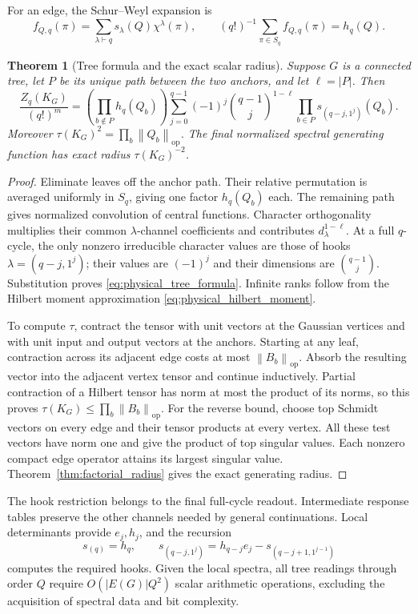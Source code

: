 \documentclass[11pt,a4paper]{amsart}
\numberwithin{equation}{section}
\newtheorem{theorem}{Theorem}[section]
\theoremstyle{definition}
\theoremstyle{remark}
\newcommand{\op}{\mathrm{op}}
\newcommand{\norm}[1]{\left\lVert#1\right\rVert}
\begin{document}
For an edge, the Schur--Weyl expansion \cite{Macdonald} is
\[
 f_{Q,q}(\pi)=\sum_{\lambda\vdash q}s_\lambda(Q)\chi^\lambda(\pi),\qquad
 (q!)^{-1}\sum_{\pi\in S_q}f_{Q,q}(\pi)=h_q(Q).
\]
\begin{theorem}[Tree formula and the exact scalar radius]\label{thm:physicaltree}
Suppose $G$ is a connected tree, let $P$ be its unique path between the two anchors, and let $\ell=|P|$. Then
\begin{equation}\label{eq:physical_tree_formula}
 \frac{Z_q(K_G)}{(q!)^m}
 =\left(\prod_{b\notin P}h_q(Q_b)\right)
 \sum_{j=0}^{q-1}(-1)^j\binom{q-1}j^{1-\ell}
                    \prod_{b\in P}s_{(q-j,1^j)}(Q_b).
\end{equation}
Moreover $\tau(K_G)^2=\prod_b\norm{Q_b}_{\op}$. The final normalized spectral generating function has exact radius $\tau(K_G)^{-2}$.
\end{theorem}
\begin{proof}
Eliminate leaves off the anchor path. Their relative permutation is averaged uniformly in $S_q$, giving one factor $h_q(Q_b)$ each. The remaining path gives normalized convolution of central functions. Character orthogonality multiplies their common $\lambda$-channel coefficients and contributes $d_\lambda^{1-\ell}$. At a full $q$-cycle, the only nonzero irreducible character values are those of hooks $\lambda=(q-j,1^j)$; their values are $(-1)^j$ and their dimensions are $\binom{q-1}j$. Substitution proves \eqref{eq:physical_tree_formula}. Infinite ranks follow from the Hilbert moment approximation \eqref{eq:physical_hilbert_moment}.

To compute $\tau$, contract the tensor with unit vectors at the Gaussian vertices and with unit input and output vectors at the anchors. Starting at any leaf, contraction across its adjacent edge costs at most $\norm{B_b}_{\op}$. Absorb the resulting vector into the adjacent vertex tensor and continue inductively. Partial contraction of a Hilbert tensor has norm at most the product of its norms, so this proves
$\tau(K_G)\le\prod_b\norm{B_b}_{\op}$.
For the reverse bound, choose top Schmidt vectors on every edge and their tensor products at every vertex. All these test vectors have norm one and give the product of top singular values. Each nonzero compact edge operator attains its largest singular value. Theorem~\ref{thm:factorial_radius} gives the exact generating radius.
\end{proof}

The hook restriction belongs to the final full-cycle readout. Intermediate response tables preserve the other channels needed by general continuations. Local determinants provide $e_j,h_j$, and the recursion
\[
 s_{(q)}=h_q,\qquad
 s_{(q-j,1^j)}=h_{q-j}e_j-s_{(q-j+1,1^{j-1})}
\]
computes the required hooks. Given the local spectra, all tree readings through order $Q$ require $O(|E(G)|Q^2)$ scalar arithmetic operations, excluding the acquisition of spectral data and bit complexity.
\end{document}
